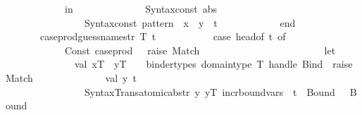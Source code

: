 \begin{isabellebody}
\ \ \ \ \ \ \ \ \ \ \ \ in\isanewline
\ \ \ \ \ \ \ \ \ \ \ \ \ \ Syntax{\isachardot}{\kern0pt}const\ \isactrlsyntaxUNDERSCOREconst {\isasymopen}{\isacharunderscore}{\kern0pt}abs{\isasymclose}\ {\isachardollar}{\kern0pt}\isanewline
\ \ \ \ \ \ \ \ \ \ \ \ \ \ \ \ {\isacharparenleft}{\kern0pt}Syntax{\isachardot}{\kern0pt}const\ \isactrlsyntaxUNDERSCOREconst {\isasymopen}{\isacharunderscore}{\kern0pt}pattern{\isasymclose}\ {\isachardollar}{\kern0pt}\ x{\isacharprime}{\kern0pt}\ {\isachardollar}{\kern0pt}\ y{\isacharparenright}{\kern0pt}\ {\isachardollar}{\kern0pt}\ t{\isacharprime}{\kern0pt}{\isacharprime}{\kern0pt}\isanewline
\ \ \ \ \ \ \ \ \ \ \ \ end{\isacharparenright}{\kern0pt}\isanewline
\ \ \ \ \ \ {\isacharbar}{\kern0pt}\ case{\isacharunderscore}{\kern0pt}prod{\isacharunderscore}{\kern0pt}guess{\isacharunderscore}{\kern0pt}names{\isacharunderscore}{\kern0pt}tr{\isacharprime}{\kern0pt}\ T\ {\isacharbrackleft}{\kern0pt}t{\isacharbrackright}{\kern0pt}\ {\isacharequal}{\kern0pt}\isanewline
\ \ \ \ \ \ \ \ \ \ {\isacharparenleft}{\kern0pt}case\ head{\isacharunderscore}{\kern0pt}of\ t\ of\isanewline
\ \ \ \ \ \ \ \ \ \ \ \ Const\ {\isacharparenleft}{\kern0pt}\isactrlconstUNDERSCOREsyntax {\isasymopen}case{\isacharunderscore}{\kern0pt}prod{\isasymclose}{\isacharcomma}{\kern0pt}\ {\isacharunderscore}{\kern0pt}{\isacharparenright}{\kern0pt}\ {\isacharequal}{\kern0pt}{\isachargreater}{\kern0pt}\ raise\ Match\isanewline
\ \ \ \ \ \ \ \ \ \ {\isacharbar}{\kern0pt}\ {\isacharunderscore}{\kern0pt}\ {\isacharequal}{\kern0pt}{\isachargreater}{\kern0pt}\isanewline
\ \ \ \ \ \ \ \ \ \ \ \ let\isanewline
\ \ \ \ \ \ \ \ \ \ \ \ \ \ val\ {\isacharparenleft}{\kern0pt}xT\ {\isacharcolon}{\kern0pt}{\isacharcolon}{\kern0pt}\ yT\ {\isacharcolon}{\kern0pt}{\isacharcolon}{\kern0pt}\ {\isacharunderscore}{\kern0pt}{\isacharparenright}{\kern0pt}\ {\isacharequal}{\kern0pt}\ binder{\isacharunderscore}{\kern0pt}types\ {\isacharparenleft}{\kern0pt}domain{\isacharunderscore}{\kern0pt}type\ T{\isacharparenright}{\kern0pt}\ handle\ Bind\ {\isacharequal}{\kern0pt}{\isachargreater}{\kern0pt}\ raise\ Match{\isacharsemicolon}{\kern0pt}\isanewline
\ \ \ \ \ \ \ \ \ \ \ \ \ \ val\ {\isacharparenleft}{\kern0pt}y{\isacharcomma}{\kern0pt}\ t{\isacharprime}{\kern0pt}{\isacharparenright}{\kern0pt}\ {\isacharequal}{\kern0pt}\isanewline
\ \ \ \ \ \ \ \ \ \ \ \ \ \ \ \ Syntax{\isacharunderscore}{\kern0pt}Trans{\isachardot}{\kern0pt}atomic{\isacharunderscore}{\kern0pt}abs{\isacharunderscore}{\kern0pt}tr{\isacharprime}{\kern0pt}\ {\isacharparenleft}{\kern0pt}{\isachardoublequote}{\kern0pt}y{\isachardoublequote}{\kern0pt}{\isacharcomma}{\kern0pt}\ yT{\isacharcomma}{\kern0pt}\ incr{\isacharunderscore}{\kern0pt}boundvars\ {}\ t\ {\isachardollar}{\kern0pt}\ Bound\ {}\ {\isachardollar}{\kern0pt}\ Bound\ {}{\isacharparenright}{\kern0pt}{\isacharsemicolon}{\kern0pt}\isanewline

\end{isabellebody}
